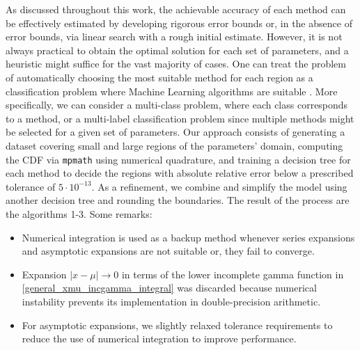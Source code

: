 \documentclass[10pt,a4paper,oneside]{article}
\numberwithin{equation}{section}
\begin{document}
As discussed throughout this work, the achievable accuracy of each method can be effectively estimated by developing rigorous error bounds or, in the absence of error bounds, via linear search with a rough initial estimate. However, it is not always practical to obtain the optimal solution for each set of parameters, and a heuristic might suffice for the vast majority of cases. One can treat the problem of automatically choosing the most suitable method for each region as a classification problem where Machine Learning algorithms are suitable \cite{Simpson2016, Navas-Palencia2019}. More specifically, we can consider a multi-class problem, where each class corresponds to a method, or a multi-label classification problem since multiple methods might be selected for a given set of parameters.
Our approach consists of generating a dataset covering small and large regions of the parameters' domain, computing the CDF via \texttt{mpmath} \cite{mpmath} using numerical quadrature, and training a decision tree for each method to decide the regions with absolute relative error below a prescribed tolerance of $5\cdot 10^{-13}$. As a refinement, we combine and simplify the model using another decision tree and rounding the boundaries. The result of the process are the algorithms 1-3. Some remarks:
\begin{itemize}
\item Numerical integration is used as a backup method whenever series expansions and asymptotic expansions are not suitable or, they fail to converge.
\item Expansion $|x-\mu| \to 0$ in terms of the lower incomplete gamma function in \eqref{general_xmu_incgamma_integral} was discarded because numerical instability prevents its implementation in double-precision arithmetic.
\item For asymptotic expansions, we slightly relaxed tolerance requirements to reduce the use of numerical integration to improve performance.
\end{itemize}
\end{document}

